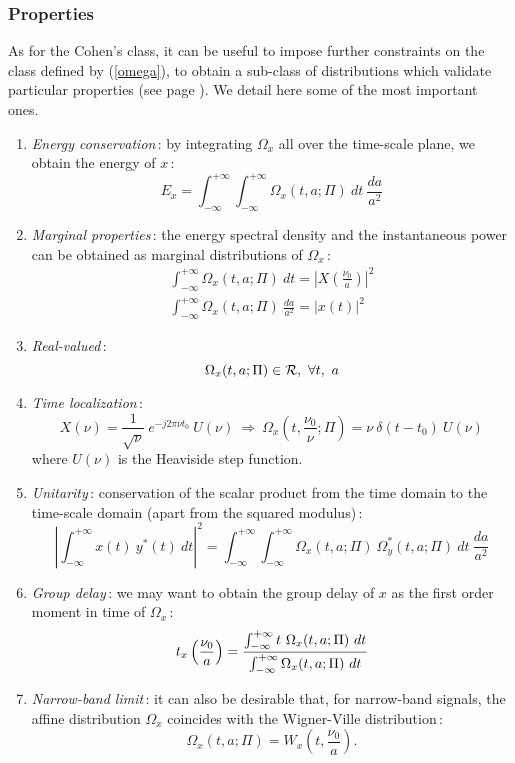 \subsubsection{Properties}

  As for the Cohen's class, it can be useful to impose further constraints
on the class defined by (\ref{omega}), to obtain a sub-class of
distributions which validate particular properties (see page
\pageref{propertieswvd}). We detail here some of the most important ones.

\begin{enumerate}
\label{propertiesaff}
\item {\it Energy conservation}\,: by
integrating $\Omega_x$ all over the time-scale plane, we obtain the energy
of $x$\,:
\[E_x = \int_{-\infty}^{+\infty} \int_{-\infty}^{+\infty}
\Omega_x(t,a;\Pi)\ dt\ \frac{da}{a^2}\] 

\item {\it Marginal properties}\,: the energy
spectral density and the instantaneous power can be obtained as marginal
distributions of $\Omega_x$\,:
\begin{eqnarray*}
\int_{-\infty}^{+\infty} \Omega_x(t,a;\Pi)\ dt = |X(\frac{\nu_0}{a})|^2 \\
\int_{-\infty}^{+\infty} \Omega_x(t,a;\Pi)\ \frac{da}{a^2} = |x(t)|^2 
\end{eqnarray*}

\item {\it Real-valued}\,: 
\[\Omega_x(t,a;\Pi) \in \Rset,\ \forall t,\ a\]

\item {\it Time localization}\,: 
\[X(\nu)=\frac{1}{\sqrt{\nu}}\ e^{-j2\pi\nu t_0}\ U(\nu)\ \Rightarrow\ 
 \Omega_x(t,\frac{\nu_0}{\nu};\Pi)=\nu\ \delta(t-t_0)\ U(\nu)\]
where $U(\nu)$ is the Heaviside step function.

\label{propunit}
\item {\it Unitarity}\,: conservation of the scalar
product from the time domain to the time-scale domain (apart from the
squared modulus)\,:
\[ \left|\int_{-\infty}^{+\infty} x(t)\ y^*(t)\ dt\right|^2 = 
\int_{-\infty}^{+\infty} \int_{-\infty}^{+\infty} \Omega_x(t,a;\Pi)\
\Omega_y^*(t,a;\Pi)\ dt\ \frac{da}{a^2}\]   

\item {\it Group delay}\,: we may want to obtain the
group delay of $x$ as the first order moment in time of $\Omega_x$\,:
\[t_x\left(\frac{\nu_0}{a}\right)={\int_{-\infty}^{+\infty} t\
\Omega_x(t,a;\Pi)\ dt\over\int_{-\infty}^{+\infty} \Omega_x(t,a;\Pi)\ dt}\] 

\item {\it Narrow-band limit}\index{narrow-band limit}\,: it can also be
desirable that, for narrow-band signals, the affine distribution $\Omega_x$
coincides with the Wigner-Ville distribution\,:
\[\Omega_x(t,a;\Pi)=W_x\left(t,\frac{\nu_0}{a}\right).\]

\end{enumerate}


